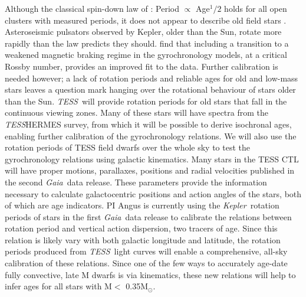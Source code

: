 \documentclass[useAMS, usenatbib, preprint, 12pt]{aastex}
\newcommand{\Kepler}{{\it Kepler}}
\newcommand{\kepler}{\Kepler}
\newcommand{\TESS}{{\it TESS}}
\newcommand{\Gaia}{{\it Gaia}}
\newcommand{\eg}{{\it e.g.}}
\begin{document}
Although the classical spin-down law of \citet{skumanich1972}: Period
$\propto$ Age$^1/2$ holds for all open clusters with measured periods, it does
not appear to describe old field stars \citep{angus2015, van-saders2016}.
Asteroseismic pulsators observed by Kepler, older than the Sun, rotate more
rapidly than the \citet{skumanich1972} law predicts they should.
\citet{van-saders2016} find that including a transition to a weakened magnetic
braking regime in the gyrochronology models, at a critical Rossby number,
provides an improved fit to the data.
Further calibration is needed however; a lack of rotation periods and
reliable ages for old and low-mass stars leaves a question mark hanging over
the rotational behaviour of stars older than the Sun.
\TESS\ will provide rotation periods for old stars that fall in the continuous
viewing zones.
Many of these stars will have spectra from the \TESS\/HERMES survey, from
which it will be possible to derive isochronal ages, enabling further
calibration of the gyrochronology relations.
We will also use the rotation periods of TESS field dwarfs over the whole sky
to test the gyrochronology relations using galactic kinematics.
Many stars in the TESS CTL will have proper motions, parallaxes, positions and
radial velocities published in the second \Gaia\ data release.
These parameters provide the information necessary to calculate galactocentric
positions and action angles of the stars, both of which are age indicators.
PI Angus is currently using the \kepler\ rotation periods of stars in the
first \Gaia\ data release to calibrate the relations between rotation period
and vertical action dispersion, two tracers of age.
Since this relation is likely vary with both galactic longitude and latitude,
the rotation periods produced from \TESS\ light curves will enable a
comprehensive, all-sky calibration of these relations.
Since one of the few ways to accurately age-date fully convective, late M
dwarfs is via kinematics, these new relations will help to infer ages for all
stars with M$<$ 0.35M$_\odot$.
\end{document}
